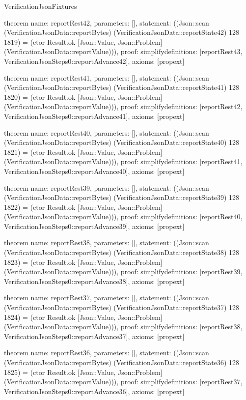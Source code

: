 \begin{lexlean}{VerificationJsonFixtures}
\begin{semanticmodule}
theorem{
  name: reportRest42,
  parameters: [],
  statement: ((Json::scan (VerificationJsonData::reportBytes) (VerificationJsonData::reportState42) 128 1819) = (ctor Result.ok [Json::Value, Json::Problem] (VerificationJsonData::reportValue))),
  proof: simplify{definitions: [reportRest43, VerificationJsonSteps0::reportAdvance42]},
  axioms: [propext]
}

theorem{
  name: reportRest41,
  parameters: [],
  statement: ((Json::scan (VerificationJsonData::reportBytes) (VerificationJsonData::reportState41) 128 1820) = (ctor Result.ok [Json::Value, Json::Problem] (VerificationJsonData::reportValue))),
  proof: simplify{definitions: [reportRest42, VerificationJsonSteps0::reportAdvance41]},
  axioms: [propext]
}

theorem{
  name: reportRest40,
  parameters: [],
  statement: ((Json::scan (VerificationJsonData::reportBytes) (VerificationJsonData::reportState40) 128 1821) = (ctor Result.ok [Json::Value, Json::Problem] (VerificationJsonData::reportValue))),
  proof: simplify{definitions: [reportRest41, VerificationJsonSteps0::reportAdvance40]},
  axioms: [propext]
}

theorem{
  name: reportRest39,
  parameters: [],
  statement: ((Json::scan (VerificationJsonData::reportBytes) (VerificationJsonData::reportState39) 128 1822) = (ctor Result.ok [Json::Value, Json::Problem] (VerificationJsonData::reportValue))),
  proof: simplify{definitions: [reportRest40, VerificationJsonSteps0::reportAdvance39]},
  axioms: [propext]
}

theorem{
  name: reportRest38,
  parameters: [],
  statement: ((Json::scan (VerificationJsonData::reportBytes) (VerificationJsonData::reportState38) 128 1823) = (ctor Result.ok [Json::Value, Json::Problem] (VerificationJsonData::reportValue))),
  proof: simplify{definitions: [reportRest39, VerificationJsonSteps0::reportAdvance38]},
  axioms: [propext]
}

theorem{
  name: reportRest37,
  parameters: [],
  statement: ((Json::scan (VerificationJsonData::reportBytes) (VerificationJsonData::reportState37) 128 1824) = (ctor Result.ok [Json::Value, Json::Problem] (VerificationJsonData::reportValue))),
  proof: simplify{definitions: [reportRest38, VerificationJsonSteps0::reportAdvance37]},
  axioms: [propext]
}

theorem{
  name: reportRest36,
  parameters: [],
  statement: ((Json::scan (VerificationJsonData::reportBytes) (VerificationJsonData::reportState36) 128 1825) = (ctor Result.ok [Json::Value, Json::Problem] (VerificationJsonData::reportValue))),
  proof: simplify{definitions: [reportRest37, VerificationJsonSteps0::reportAdvance36]},
  axioms: [propext]
}


\end{semanticmodule}
\end{lexlean}

